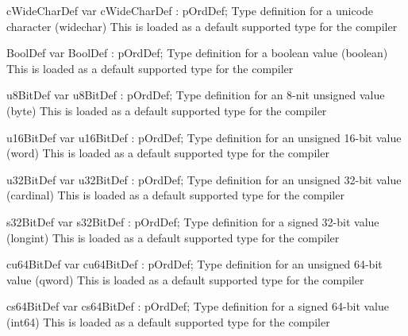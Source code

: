 \documentclass [a4paper,12pt]{article}
\begin{document}
\begin{variable}{cWideCharDef}
\Declaration
var cWideCharDef : pOrdDef;
\Description
Type definition for a unicode character (\textsf{widechar})
\Notes
This is loaded as a default supported type for the compiler
\end{variable}

\begin{variable}{BoolDef}
\Declaration
var BoolDef : pOrdDef;
\Description
Type definition for a boolean value (\textsf{boolean})
\Notes
This is loaded as a default supported type for the compiler
\end{variable}

\begin{variable}{u8BitDef}
\Declaration
var u8BitDef : pOrdDef;
\Description
Type definition for an 8-nit unsigned value (\textsf{byte})
\Notes
This is loaded as a default supported type for the compiler
\end{variable}

\begin{variable}{u16BitDef}
\Declaration
var u16BitDef : pOrdDef;
\Description
Type definition for an unsigned 16-bit value (\textsf{word})
\Notes
This is loaded as a default supported type for the compiler
\end{variable}

\begin{variable}{u32BitDef}
\Declaration
var u32BitDef : pOrdDef;
\Description
Type definition for an unsigned 32-bit value (\textsf{cardinal})
\Notes
This is loaded as a default supported type for the compiler
\end{variable}

\begin{variable}{s32BitDef}
\Declaration
var s32BitDef : pOrdDef;
\Description
Type definition for a signed 32-bit value (\textsf{longint})
\Notes
This is loaded as a default supported type for the compiler
\end{variable}

\begin{variable}{cu64BitDef}
\Declaration
var cu64BitDef : pOrdDef;
\Description
Type definition for an unsigned 64-bit value (\textsf{qword})
\Notes
This is loaded as a default supported type for the compiler
\end{variable}

\begin{variable}{cs64BitDef}
\Declaration
var cs64BitDef : pOrdDef;
\Description
Type definition for a signed 64-bit value (\textsf{int64})
\Notes
This is loaded as a default supported type for the compiler
\end{variable}
\end{document}
